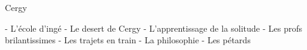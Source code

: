 Cergy

- L'école d'ingé
- Le desert de Cergy 
- L'apprentissage  de la solitude
- Les profs brilantissimes
- Les trajets en train
- La philosophie
- Les pétards
